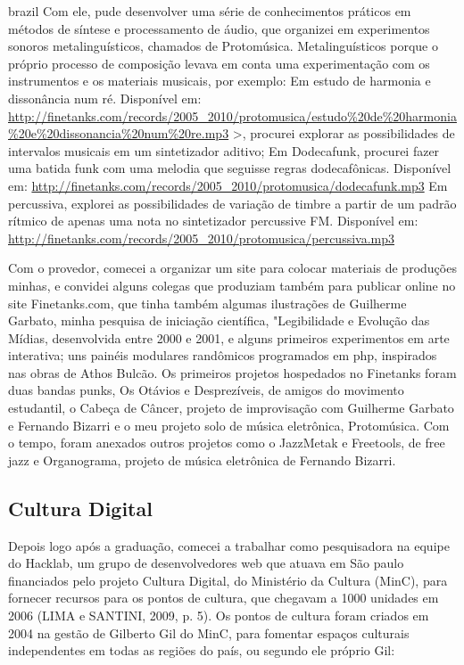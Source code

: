 \begin{otherlanguage*}{brazil}
Com ele, pude desenvolver uma série de conhecimentos práticos em métodos de síntese e processamento de áudio, que organizei em experimentos sonoros metalinguísticos, chamados de Protomúsica. Metalinguísticos porque o próprio processo de composição levava em conta uma experimentação com os instrumentos e os materiais musicais, por exemplo:
Em estudo de harmonia e dissonância num ré. Disponível em: \url{http://finetanks.com/records/2005_2010/protomusica/estudo\%20de\%20harmonia\%20e\%20dissonancia\%20num\%20re.mp3} >, procurei explorar as possibilidades de intervalos musicais em um sintetizador aditivo;
Em Dodecafunk, procurei fazer uma batida funk com uma melodia que seguisse regras dodecafônicas. Disponível em: \url{http://finetanks.com/records/2005_2010/protomusica/dodecafunk.mp3}
Em percussiva, explorei as possibilidades de variação de timbre a partir de um padrão rítmico de apenas uma nota no sintetizador percussive FM. Disponível em: \url{http://finetanks.com/records/2005_2010/protomusica/percussiva.mp3}

Com o provedor, comecei a organizar um site para colocar materiais de produções minhas, e convidei alguns colegas que produziam também para publicar online no site Finetanks.com, que tinha também algumas ilustrações de Guilherme Garbato, minha pesquisa de iniciação científica, "Legibilidade e Evolução das Mídias, desenvolvida entre 2000 e 2001, e alguns primeiros experimentos em arte interativa; uns painéis modulares randômicos programados em php, inspirados nas obras de Athos Bulcão.  
Os primeiros projetos hospedados no Finetanks foram duas bandas punks, Os Otávios e Desprezíveis, de amigos do movimento estudantil, o Cabeça de Câncer, projeto de improvisação com Guilherme Garbato e Fernando Bizarri e o meu projeto solo de música eletrônica, Protomúsica. Com o tempo, foram anexados outros projetos como o JazzMetak e Freetools, de free jazz e Organograma, projeto de música eletrônica de Fernando Bizarri.

\subsection{Cultura Digital}

Depois logo após a graduação, comecei a trabalhar como pesquisadora na equipe do Hacklab, um grupo de desenvolvedores web que atuava em São paulo financiados pelo projeto Cultura Digital, do Ministério da Cultura (MinC), para fornecer recursos para os pontos de cultura, que chegavam a 1000 unidades em 2006 (LIMA e SANTINI, 2009, p. 5). Os pontos de cultura foram criados em 2004 na gestão de Gilberto Gil do MinC, para fomentar espaços culturais independentes em todas as regiões do país, ou segundo ele próprio Gil:
\begin{citacao}


\end{citacao}
\end{otherlanguage*}
